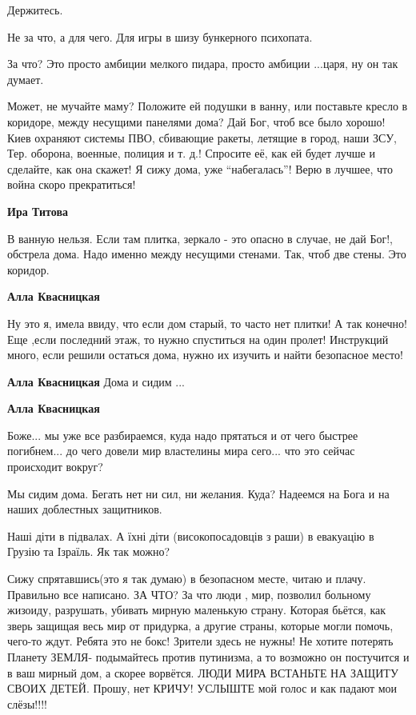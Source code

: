 \begin{itemize}
Держитесь.

Не за что, а для чего. Для игры в шизу бункерного психопата.

За что? Это просто амбиции мелкого пидара, просто амбиции ...царя, ну он так думает.


Может, не мучайте маму? Положите ей подушки в ванну, или поставьте кресло в
коридоре, между несущими панелями дома? Дай Бог, чтоб все было хорошо! Киев
охраняют системы ПВО, сбивающие ракеты, летящие в город, наши
ЗСУ, Тер. оборона, военные, полиция и т. д.! Спросите её, как ей будет лучше и
сделайте, как она скажет! Я сижу дома, уже \enquote{набегалась}! Верю в лучшее, что война
скоро прекратиться!

\begin{itemize} %
\textbf{Ира Титова} 

В ванную нельзя. Если там плитка, зеркало - это опасно в случае, не дай Бог!,
обстрела дома. Надо именно между несущими стенами. Так, чтоб две стены. Это
коридор.

\textbf{Алла Квасницкая} 

Ну это я, имела ввиду, что если дом старый, то часто нет плитки! А так конечно! Еще
,если последний этаж, то нужно спуститься на один пролет! Инструкций много, если
решили остаться дома, нужно их изучить и найти безопасное место!

\textbf{Алла Квасницкая} Дома и сидим ...

\textbf{Алла Квасницкая} 

Боже... мы уже все разбираемся, куда надо прятаться и от чего быстрее
погибнем... до чего довели мир властелины мира сего... что это сейчас происходит
вокруг?


Мы сидим дома. Бегать нет ни сил, ни желания. Куда? Надеемся на Бога и на наших
доблестных защитников.

\end{itemize} %


Наші діти в підвалах. А їхні діти (високопосадовців з раши) в евакуацію в
Грузію та Ізраїль. Як так можно?


Сижу спрятавшись(это я так думаю) в безопасном месте, читаю и плачу. Правильно
все написано. ЗА ЧТО? За что люди , мир, позволил больному жизоиду,
разрушать, убивать мирную маленькую страну. Которая бьётся, как зверь защищая
весь мир от придурка, а другие страны, которые могли помочь, чего-то ждут.
Ребята это не бокс! Зрители здесь не нужны! Не хотите потерять Планету ЗЕМЛЯ-
подымайтесь против путинизма, а то возможно он постучится и в ваш мирный дом, а
скорее ворвётся. ЛЮДИ МИРА ВСТАНЬТЕ НА ЗАЩИТУ СВОИХ ДЕТЕЙ. Прошу, нет КРИЧУ!
УСЛЫШТЕ мой голос и как падают мои слёзы!!!!


\end{itemize}
